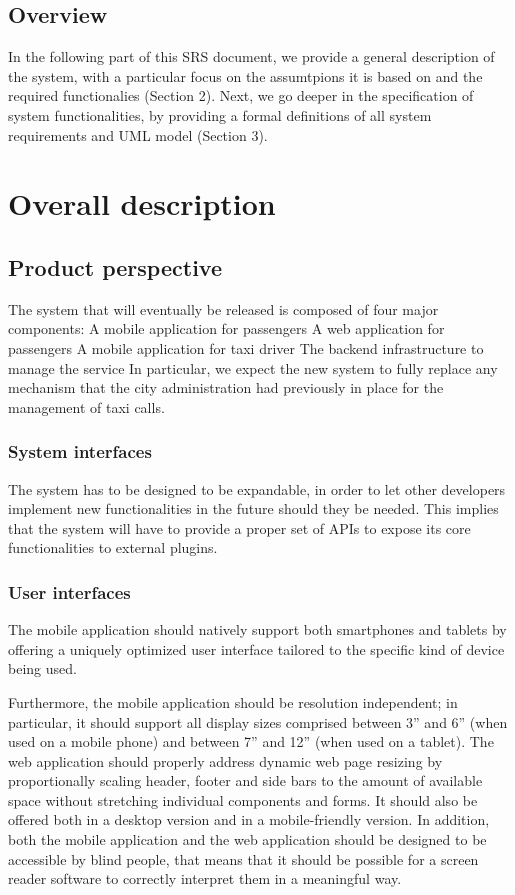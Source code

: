 \documentclass{book}
\begin{document}
\section{Overview}
In the following part of this SRS document, we provide a general description of the system, with a particular focus on the assumtpions it is based on and the required functionalies (Section 2). Next, we go deeper in the specification of system functionalities, by providing a formal definitions of all system requirements and UML model (Section 3).

\chapter{Overall description}
\section{Product perspective}
The system that will eventually be released is composed of four major components:
A mobile application for passengers
A web application for passengers
A mobile application for taxi driver
The backend infrastructure to manage the service
In particular, we expect the new system to fully replace any mechanism that the city administration had previously in place for the management of taxi calls.

\subsection{System interfaces}
The system has to be designed to be expandable, in order to let other developers implement new functionalities in the future should they be needed. This implies that the system will have to provide a proper set of APIs to expose its core functionalities to external plugins. 

\subsection{User interfaces}
The mobile application should natively support both smartphones and tablets by offering a uniquely optimized user interface tailored to the specific kind of device being used. 

Furthermore, the mobile application should be resolution independent; in particular, it should support all display sizes comprised between 3” and 6” (when used on a mobile phone) and between 7” and 12” (when used on a tablet). 
The web application should properly address dynamic web page resizing by proportionally scaling header, footer and side bars to the amount of available space without stretching individual components and forms. It should also be offered both in a desktop version and in a mobile-friendly version. 
In addition, both the mobile application and the web application should be designed to be accessible by blind people, that means that it should be possible for a screen reader software to correctly interpret them in a meaningful way.
\end{document}
